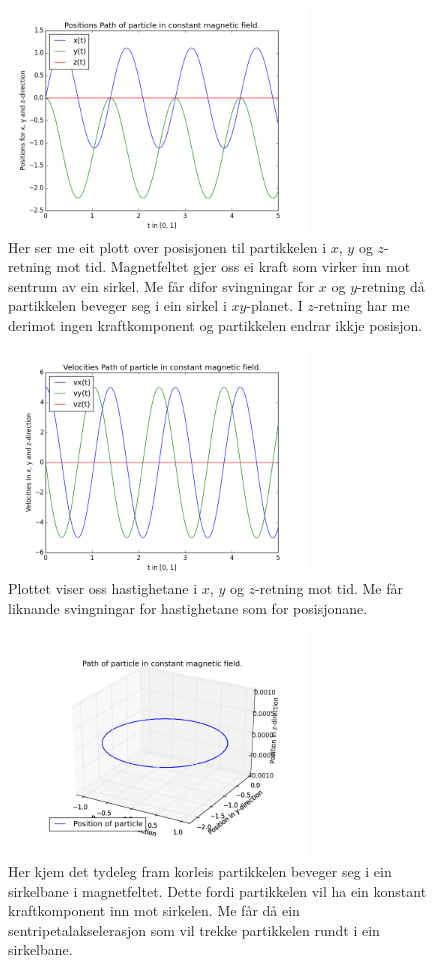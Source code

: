 \documentclass[11pt, a4paper]{article}
\begin{document}
  \begin{figure}[H]
    \centering
    \includegraphics[width=300px]{2A1.png}
    \caption{Her ser me eit plott over posisjonen til partikkelen i $x$, $y$ og $z$-retning mot tid. Magnetfeltet gjer oss ei kraft som virker inn mot sentrum av ein sirkel. 
    Me får difor svingningar for $x$ og $y$-retning då partikkelen beveger seg i ein sirkel i $xy$-planet. I $z$-retning har me derimot ingen kraftkomponent og partikkelen endrar ikkje 
    posisjon.}
  \end{figure}

  \begin{figure}[H]
    \centering
    \includegraphics[width=300px]{2A2.png}
    \caption{Plottet viser oss hastighetane i $x$, $y$ og $z$-retning mot tid. Me får liknande svingningar for hastighetane som for posisjonane.}
  \end{figure}

  \begin{figure}[H]
    \centering
    \includegraphics[width=300px]{2A3.png}
    \caption{Her kjem det tydeleg fram korleis partikkelen beveger seg i ein sirkelbane i magnetfeltet. Dette fordi partikkelen vil ha ein konstant kraftkomponent inn mot sirkelen.
    Me får då ein sentripetalakselerasjon som vil trekke partikkelen rundt i ein sirkelbane.}
  \end{figure}
\end{document}
